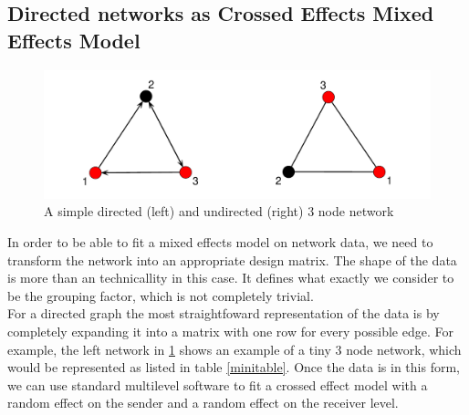 \documentclass[a4paper]{article}
\begin{document}
  
\subsection{Directed networks as Crossed Effects Mixed Effects Model}

\begin{figure}[h!]
\centering
\includegraphics{paper-mininet}
\caption{A simple directed (left) and undirected (right) 3 node network}
\label{fig:mininet1}
\end{figure}

In order to be able to fit a mixed effects model on network data, we need to transform the network into an appropriate design matrix. The shape of the data
is more than an technicallity in this case. It defines what exactly we consider to be the grouping factor, which is not completely trivial. \\

For a directed graph the most straightfoward representation of the data is by completely expanding it into a matrix with one row 
for every possible edge. For example, the left network in \ref{fig:mininet1} shows an example of a tiny 3 node network,
which would be represented as listed in table \ref{minitable}. Once the data is in this form, we can use standard multilevel software
to fit a crossed effect model with a random effect on the sender and a random effect on the receiver level. 
\end{document}
